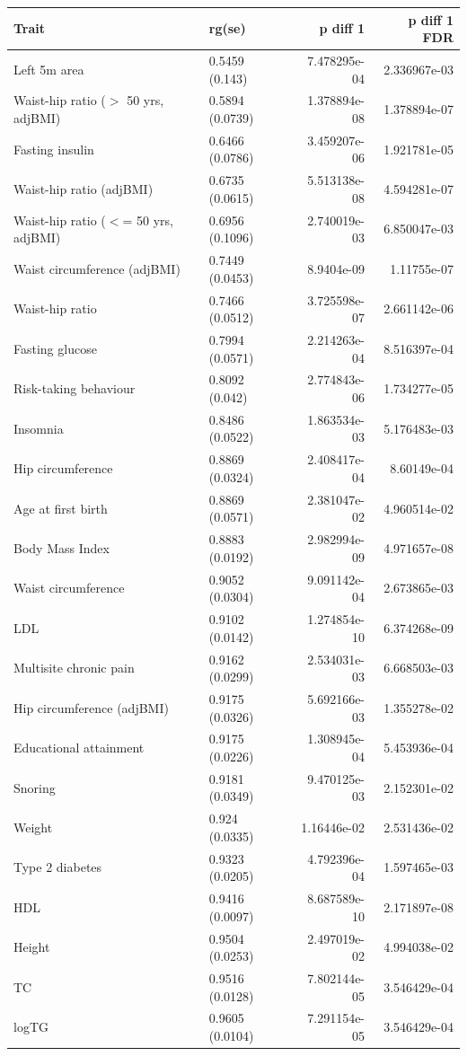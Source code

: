 \begin{table}[ht]
\centering
\begin{tabular}{llrr}
  \hline
Trait & rg(se) & p diff 1 & p diff 1 FDR \\ 
  \hline

Left 5m area & 0.5459 (0.143) & 7.478295e-04 & 2.336967e-03 \\ 
  Waist-hip ratio ($>$ 50 yrs, adjBMI) & 0.5894 (0.0739) & 1.378894e-08 & 1.378894e-07 \\ 
  Fasting insulin & 0.6466 (0.0786) & 3.459207e-06 & 1.921781e-05 \\ 
  Waist-hip ratio (adjBMI) & 0.6735 (0.0615) & 5.513138e-08 & 4.594281e-07 \\ 
  Waist-hip ratio ($<$= 50 yrs, adjBMI) & 0.6956 (0.1096) & 2.740019e-03 & 6.850047e-03 \\ 
  Waist circumference (adjBMI) & 0.7449 (0.0453) & 8.9404e-09 & 1.11755e-07 \\ 
  Waist-hip ratio  & 0.7466 (0.0512) & 3.725598e-07 & 2.661142e-06 \\ 
  Fasting glucose & 0.7994 (0.0571) & 2.214263e-04 & 8.516397e-04 \\ 
  Risk-taking behaviour & 0.8092 (0.042) & 2.774843e-06 & 1.734277e-05 \\ 
  Insomnia & 0.8486 (0.0522) & 1.863534e-03 & 5.176483e-03 \\ 
  Hip circumference  & 0.8869 (0.0324) & 2.408417e-04 & 8.60149e-04 \\ 
  Age at first birth  & 0.8869 (0.0571) & 2.381047e-02 & 4.960514e-02 \\ 
  Body Mass Index  & 0.8883 (0.0192) & 2.982994e-09 & 4.971657e-08 \\ 
  Waist circumference  & 0.9052 (0.0304) & 9.091142e-04 & 2.673865e-03 \\ 
  LDL & 0.9102 (0.0142) & 1.274854e-10 & 6.374268e-09 \\ 
  Multisite chronic pain & 0.9162 (0.0299) & 2.534031e-03 & 6.668503e-03 \\ 
  Hip circumference (adjBMI) & 0.9175 (0.0326) & 5.692166e-03 & 1.355278e-02 \\ 
  Educational attainment & 0.9175 (0.0226) & 1.308945e-04 & 5.453936e-04 \\ 
  Snoring & 0.9181 (0.0349) & 9.470125e-03 & 2.152301e-02 \\ 
  Weight  & 0.924 (0.0335) & 1.16446e-02 & 2.531436e-02 \\ 
  Type 2 diabetes & 0.9323 (0.0205) & 4.792396e-04 & 1.597465e-03 \\ 
  HDL & 0.9416 (0.0097) & 8.687589e-10 & 2.171897e-08 \\ 
  Height  & 0.9504 (0.0253) & 2.497019e-02 & 4.994038e-02 \\ 
  TC & 0.9516 (0.0128) & 7.802144e-05 & 3.546429e-04 \\ 
  logTG & 0.9605 (0.0104) & 7.291154e-05 & 3.546429e-04 \\ 


   \hline
\end{tabular}
\end{table}

